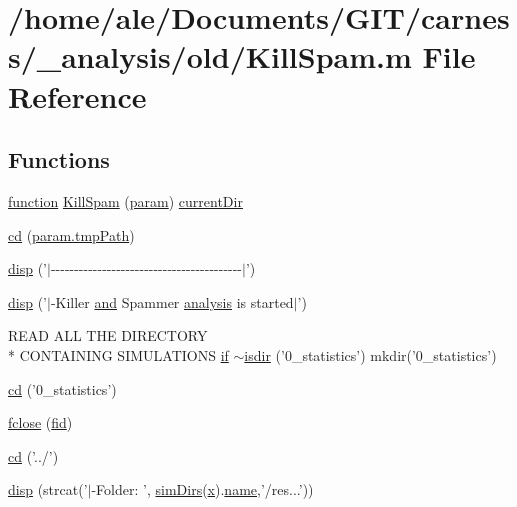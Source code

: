 \hypertarget{a00023}{\section{/home/ale/\-Documents/\-G\-I\-T/carness/\-\_\-analysis/old/\-Kill\-Spam.m File Reference}
\label{a00023}
}
\subsection*{Functions}
\begin{DoxyCompactItemize}
\item 
\hyperlink{a00062_a4b4c670b101bf7a838f775e008fa6255}{function} \hyperlink{a00023_acfbe15da69f5cf2e58667e2b19b500e7}{Kill\-Spam} (\hyperlink{a00027_a51f20d6b1b54a2eee3be0e8adc96a0ae}{param}) \hyperlink{a00025_af32eb97339f1e9d37b5540de2cbc79c9}{current\-Dir}
\item 
\hyperlink{a00023_a60547755325ad4e7a25c614f83776ee7}{cd} (\hyperlink{a00026_a1e5a4863ab2b87f923e1d19e2da1f5ac}{param.\-tmp\-Path})
\item 
\hyperlink{a00023_a3015506d09b4ef94312c10ce85f4c3ad}{disp} ('$|$-\/-\/-\/-\/-\/-\/-\/-\/-\/-\/-\/-\/-\/-\/-\/-\/-\/-\/-\/-\/-\/-\/-\/-\/-\/-\/-\/-\/-\/-\/-\/-\/-\/-\/-\/-\/-\/-\/-\/-\/-\/$|$')
\item 
\hyperlink{a00023_a16c8f16b559b22e1f31c9e00f75fe520}{disp} ('$|$-\/Killer \hyperlink{a00022_a170f8acb213f91bf71c77b1d20bceb33}{and} Spammer \hyperlink{a00026_abf6e5638a23a2531114655f3f690b70c}{analysis} is started$|$')
\item 
R\-E\-A\-D A\-L\-L T\-H\-E D\-I\-R\-E\-C\-T\-O\-R\-Y \\*
C\-O\-N\-T\-A\-I\-N\-I\-N\-G S\-I\-M\-U\-L\-A\-T\-I\-O\-N\-S \hyperlink{a00024_a01d55766b8058903dd360b4bda71f9f5}{if} \hyperlink{a00023_aef429e9a25e0d4d70aa2037a59816956}{$\sim$isdir} ('0\-\_\-statistics') mkdir('0\-\_\-statistics')
\item 
\hyperlink{a00023_a365d011aeb5adcedc5cc75e7df629a6f}{cd} ('0\-\_\-statistics')
\item 
\hyperlink{a00023_a5e769bbbabcaddc548203741c7100228}{fclose} (\hyperlink{a00025_ae9011d40c6f13e68e6f07156e0da7c5d}{fid})
\item 
\hyperlink{a00023_a7eb00a69197e8905221801683c7ec02a}{cd} ('../')
\item 
\hyperlink{a00023_a609f02c862f2843febf3408f688be8e8}{disp} (strcat('$|$-\/Folder\-: ', \hyperlink{a00025_aae5035eb84b89176ed5b06e136325eff}{sim\-Dirs}(\hyperlink{a00025_a7265972fe485274cfff77a9bb07b8fce}{x}).\hyperlink{a00021_abbf559a76fab59203496b0847ab9502a}{name},'/res...'))

\end{DoxyCompactItemize}
